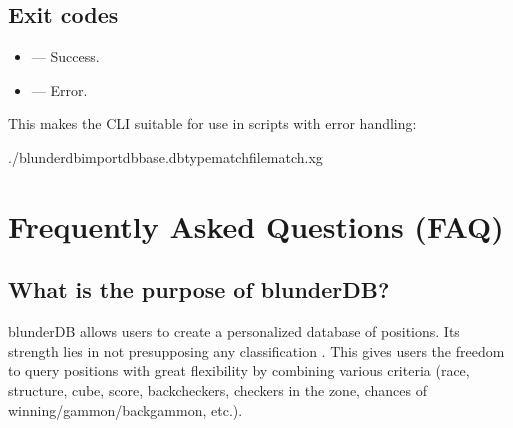 \documentclass[letterpaper,10pt,english]{sphinxmanual}
\begin{document}
\subsection{Exit codes}
\label{\detokenize{cli:codes-de-retour}}\begin{itemize}
\item {} 
\sphinxAtStartPar
{} — Success.

\item {} 
\sphinxAtStartPar
{} — Error.

\end{itemize}

\sphinxAtStartPar
This makes the CLI suitable for use in scripts with error handling:

\begin{sphinxVerbatim}[commandchars=\\\{\}]
./blunderdbimport\PYGZhy{}\PYGZhy{}dbbase.db\PYGZhy{}\PYGZhy{}typematch\PYGZhy{}\PYGZhy{}filematch.xg
\end{sphinxVerbatim}

\sphinxstepscope


\section{Frequently Asked Questions (FAQ)}
\label{\detokenize{faq:foire-aux-questions}}\label{\detokenize{faq:faq}}\label{\detokenize{faq::doc}}

\subsection{What is the purpose of blunderDB?}
\label{\detokenize{faq:quel-est-l-utilite-de-blunderdb}}
\sphinxAtStartPar
blunderDB allows users to create a personalized database of positions. Its strength lies in not presupposing any classification . This gives users the freedom to query positions with great flexibility by combining various criteria (race, structure, cube, score, backcheckers, checkers in the zone, chances of winning/gammon/backgammon, etc.).
\end{document}
